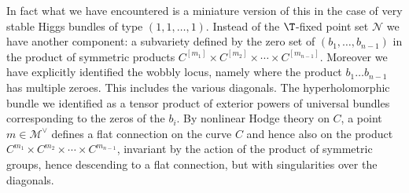 In fact what we have encountered is a miniature version of this in the case of very stable Higgs bundles of type $(1,1,\dots, 1)$. Instead of the $\T$-fixed point set ${\mathcal N}$ we have another component: a subvariety defined by the zero set of $(b_1,\dots, b_{n-1})$ in the product of symmetric products $C^{[m_1]}\times C^{[m_2]}\times \cdots \times C^{[m_{n-1}]}$. Moreover we have explicitly  identified  the wobbly locus, namely where the product $b_1\dots b_{n-1}$ has multiple zeroes. This  includes the various diagonals. The hyperholomorphic bundle we identified as a tensor product of exterior powers of universal bundles corresponding to the zeros of the $b_i$. By nonlinear Hodge theory on $C$, a point $m\in {\mathcal M}^{\vee}$ defines a flat connection on the curve $C$ and hence also on the product $C^{m_1}\times C^{m_2}\times \cdots \times C^{m_{n-1}}$, invariant by the action of the product of symmetric groups, hence descending to a flat connection, but with singularities over the diagonals.
